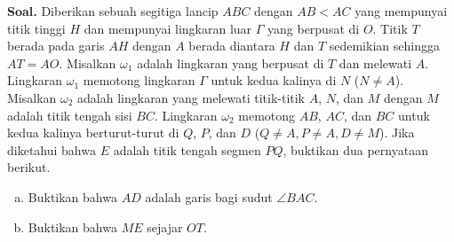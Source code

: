 \documentclass[12pt]{scrartcl}
\author{Soal Esai Nomor 4 KTOM Oktober 2021}
\date{Official solution by Azzam L. H.}
\begin{document}
\maketitle


 \textbf{Soal.} Diberikan sebuah segitiga lancip $ABC$ dengan $AB < AC$ yang mempunyai titik tinggi $H$ dan  mempunyai lingkaran luar $\Gamma$ yang berpusat di $O$. Titik $T$ berada pada garis $AH$ dengan $A$ berada diantara $H$ dan $T$ sedemikian sehingga $AT=AO$. Misalkan  $\omega_1$ adalah lingkaran yang berpusat di $T$ dan melewati $A$. Lingkaran $\omega_1$ memotong lingkaran $\Gamma$ untuk kedua kalinya di $N$ ($N \neq A$). Misalkan $\omega_2$ adalah lingkaran yang melewati titik-titik $A$, $N$, dan $M$ dengan $M$ adalah titik tengah sisi $BC$. Lingkaran $\omega_2$ memotong $AB$, $AC$, dan $BC$ untuk kedua kalinya berturut-turut di $Q$, $P$, dan $D$ ($Q \neq A, P \neq A, D \neq M$). Jika diketahui bahwa $E$ adalah titik tengah segmen $PQ$, buktikan dua pernyataan berikut.
\begin{enumerate}[a)]
\item Buktikan bahwa $AD$ adalah garis bagi sudut $\angle BAC$.
\item Buktikan bahwa $ME$ sejajar $OT$.
\end{enumerate}
\newpage
\end{document}
